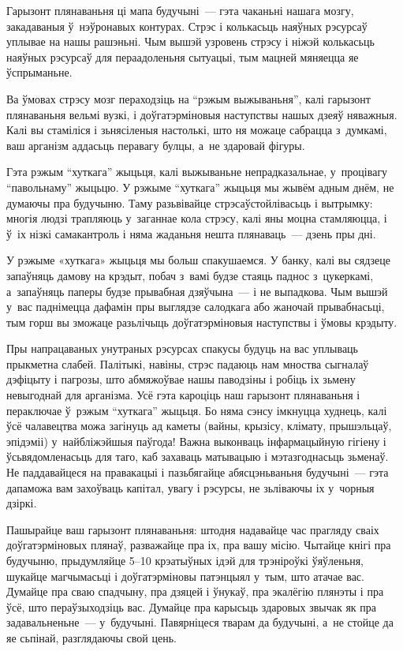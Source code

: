 Гарызонт плянаваньня ці мапа будучыні~--- гэта чаканьні нашага мозгу, закадаваныя ў~нэўронавых контурах. Стрэс і колькасьць наяўных рэсурсаў уплывае на нашы рашэньні. Чым вышэй узровень стрэсу і ніжэй колькасьць наяўных рэсурсаў для пераадоленьня сытуацыі, тым мацней мяняецца яе ўспрыманьне.

Ва ўмовах стрэсу мозг пераходзіць на ``рэжым выжываньня'', калі гарызонт плянаваньня вельмі вузкі, і доўгатэрміновыя наступствы нашых дзеяў няважныя. Калі вы стаміліся і зьнясіленыя настолькі, што ня можаце сабрацца з~думкамі, ваш арганізм аддасьць перавагу булцы, а~не здаровай фігуры.

Гэта рэжым ``хуткага'' жыцьця, калі выжываньне непрадказальнае, у~процівагу ``павольнаму'' жыцьцю. У рэжыме ``хуткага'' жыцьця мы жывём адным днём, не думаючы пра будучыню. Таму разьвівайце стрэсаўстойлівасьць і вытрымку: многія людзі трапляюць у~заганнае кола стрэсу, калі яны моцна стамляюцца, і ў~іх нізкі самакантроль і няма жаданьня нешта плянаваць~--- дзень пры дні.

У рэжыме «хуткага» жыцьця мы больш спакушаемся. У банку, калі вы сядзеце запаўняць дамову на крэдыт, побач з~вамі будзе стаяць паднос з~цукеркамі, а~запаўняць паперы будзе прывабная дзяўчына~--- і не выпадкова. Чым вышэй у~вас паднімецца дафамін пры выглядзе салодкага або жаночай прывабнасьці, тым горш вы зможаце разьлічыць доўгатэрміновыя наступствы і ўмовы крэдыту.

Пры напрацаваных унутраных рэсурсах спакусы будуць на вас уплываць прыкметна слабей. Палітыкі, навіны, стрэс падаюць нам мноства сыгналаў дэфіцыту і пагрозы, што абмяжоўвае нашы паводзіны і робіць іх зьмену невыгоднай для арганізма. Усё гэта кароціць наш гарызонт плянаваньня і пераключае ў~рэжым ``хуткага'' жыцьця. Бо няма сэнсу імкнуцца худнець, калі ўсё чалавецтва можа загінуць ад каметы (вайны, крызісу, клімату, прышэльцаў, эпідэміі) у~найбліжэйшыя паўгода! Важна выконваць інфармацыйную гігіену і ўсьвядомленасьць для таго, каб захаваць матывацыю і мэтазгоднасьць зьменаў. Не паддавайцеся на правакацыі і пазьбягайце абясцэньваньня будучыні~--- гэта дапаможа вам захоўваць капітал, увагу і рэсурсы, не зьліваючы іх у~чорныя дзіркі.

Пашырайце ваш гарызонт плянаваньня: штодня надавайце час прагляду сваіх доўгатэрміновых плянаў, разважайце пра іх, пра вашу місію. Чытайце кнігі пра будучыню, прыдумляйце 5--10 крэатыўных ідэй для трэніроўкі ўяўленьня, шукайце магчымасьці і доўгатэрміновы патэнцыял у~тым, што атачае вас. Думайце пра сваю спадчыну, пра дзяцей і ўнукаў, пра экалёгію плянэты і пра ўсё, што пераўзыходзіць вас. Думайце пра карысьць здаровых звычак як пра задавальненьне~--- у~будучыні. Павярніцеся тварам да будучыні, а~не стойце да яе сьпінай, разглядаючы свой цень.

